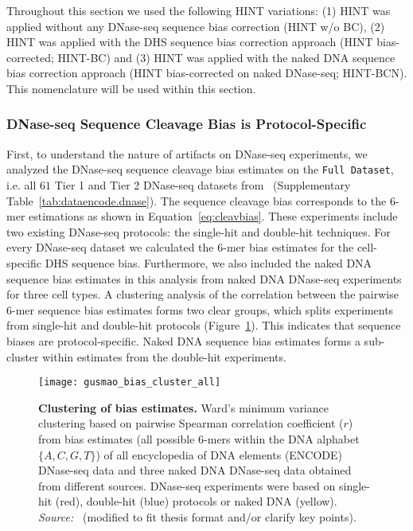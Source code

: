 Throughout this section we used the following HINT variations: (1) HINT was applied without any DNase-seq sequence bias correction (HINT w/o BC), (2) HINT was applied with the DHS sequence bias correction approach (HINT bias-corrected; HINT-BC) and (3) HINT was applied with the naked DNA sequence bias correction approach (HINT bias-corrected on naked DNase-seq; HINT-BCN). This nomenclature will be used within this section.

\subsubsection{DNase-seq Sequence Cleavage Bias is Protocol-Specific}

First, to understand the nature of artifacts on DNase-seq experiments, we analyzed the DNase-seq sequence cleavage bias estimates on the {\tt Full Dataset}, i.e. all $61$ Tier 1 and Tier 2 DNase-seq datasets from~\cite{encode2012} (Supplementary Table~\ref{tab:dataencode.dnase}). The sequence cleavage bias corresponds to the $6$-mer estimations as shown in Equation~\ref{eq:cleavbias}. These experiments include two existing DNase-seq protocols: the single-hit and double-hit techniques. For every DNase-seq dataset we calculated the $6$-mer bias estimates for the cell-specific DHS sequence bias. Furthermore, we also included the naked DNA sequence bias estimates in this analysis from naked DNA DNase-seq experiments for three cell types. A clustering analysis of the correlation between the pairwise $6$-mer sequence bias estimates forms two clear groups, which splits experiments from single-hit and double-hit protocols (Figure~\ref{fig:gusmao_bias_cluster_all}). This indicates that sequence biases are protocol-specific. Naked DNA sequence bias estimates forms a sub-cluster within estimates from the double-hit experiments.

\begin{figure}[h!]
\centering
\texttt{[image: gusmao\_bias\_cluster\_all]}
\caption[Clustering of bias estimates]{\textbf{Clustering of bias estimates.} Ward's minimum variance clustering based on pairwise Spearman correlation coefficient ($r$) from bias estimates (all possible $6$-mers within the DNA alphabet $\{A, C, G, T\}$) of all encyclopedia of DNA elements (ENCODE) DNase-seq data and three naked DNA DNase-seq data obtained from different sources. DNase-seq experiments were based on single-hit (red), double-hit (blue) protocols or naked DNA (yellow). \emph{Source:~\cite{gusmao2016}} (modified to fit thesis format and/or clarify key points).}
\label{fig:gusmao_bias_cluster_all}
\end{figure}

